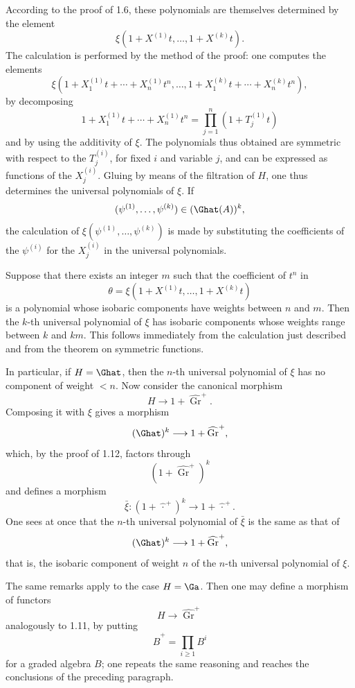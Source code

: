 According to the proof of 1.6, these polynomials are themselves determined by the element
\[
  \xi(1+X^{(1)}t,\ldots,1+X^{(k)}t).
\]
The calculation is performed by the method of the proof: one computes the elements
\[
  \xi(1+X_1^{(1)}t+\cdots+X_n^{(1)}t^n,\ldots,
        1+X_1^{(k)}t+\cdots+X_n^{(k)}t^n),
\]
by decomposing
\[
  1+X_1^{(1)}t+\cdots+X_n^{(1)}t^n
  =\prod_{j=1}^n(1+T_j^{(1)}t)
\]
and by using the additivity of \(\xi\). The polynomials thus obtained are symmetric with respect to the \(T_j^{(i)}\), for fixed \(i\) and variable \(j\), and can be expressed as functions of the \(X_j^{(i)}\). Gluing by means of the filtration of \(H\), one thus determines the universal polynomials of \(\xi\). If
\[
  (\psi^{(1)},\ldots,\psi^{(k)})\in(\Ghat(A))^k,
\]
the calculation of \(\xi(\psi^{(1)},\ldots,\psi^{(k)})\) is made by substituting the coefficients of the \(\psi^{(i)}\) for the \(X_j^{(i)}\) in the universal polynomials.

Suppose that there exists an integer \(m\) such that the coefficient of \(t^n\) in
\[
  \theta=\xi(1+X^{(1)}t,\ldots,1+X^{(k)}t)
\]
is a polynomial whose isobaric components have weights between \(n\) and \(m\). Then the \(k\)-th universal polynomial of \(\xi\) has isobaric components whose weights range between \(k\) and \(km\). This follows immediately from the calculation just described and from the theorem on symmetric functions.

In particular, if \(H=\Ghat\), then the \(n\)-th universal polynomial of \(\xi\) has no component of weight \(<n\). Now consider the canonical morphism
\[
  H\longrightarrow 1+\widehat{\operatorname{Gr}}^{+}.
\]
Composing it with \(\xi\) gives a morphism
\[
  (\Ghat)^k\longrightarrow 1+\widehat{\operatorname{Gr}}^{+},
\]
which, by the proof of 1.12, factors through
\[
  (1+\widehat{\operatorname{Gr}}^{+})^k
\]
and defines a morphism
\[
  \bar\xi:(1+\widehat{\,\cdot\,}^{+})^k\longrightarrow 1+\widehat{\,\cdot\,}^{+}.
\]
One sees at once that the \(n\)-th universal polynomial of \(\bar\xi\) is the same as that of
\[
  (\Ghat)^k\longrightarrow 1+\widehat{\operatorname{Gr}}^{+},
\]
that is, the isobaric component of weight \(n\) of the \(n\)-th universal polynomial of \(\xi\).

The same remarks apply to the case \(H=\Ga\). Then one may define a morphism of functors
\[
  H\longrightarrow \widehat{\operatorname{Gr}}^{+}
\]
analogously to 1.11, by putting
\[
  \widehat B^{+}=\prod_{i\geq 1}B^i
\]
for a graded algebra \(B\); one repeats the same reasoning and reaches the conclusions of the preceding paragraph.

